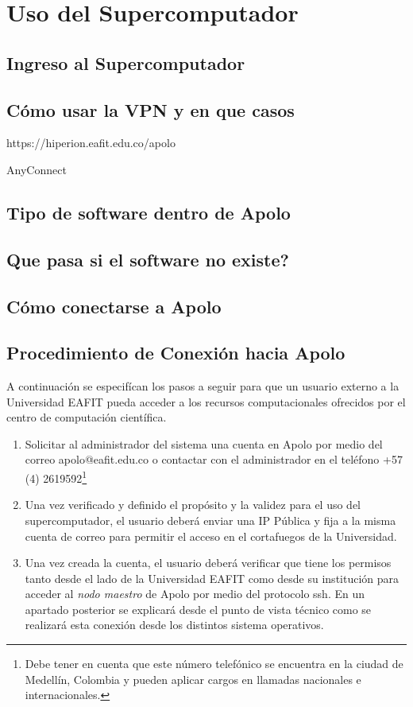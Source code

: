 \section{Uso del Supercomputador}

\subsection{Ingreso al Supercomputador}
\subsection{Cómo usar la VPN y en que casos}

https://hiperion.eafit.edu.co/apolo

AnyConnect

\subsection{Tipo de software dentro de Apolo}
\subsection{Que pasa si el software no existe?}
\subsection{Cómo conectarse a Apolo}


\subsection{Procedimiento de Conexión hacia Apolo}


A continuación se especifícan los pasos a seguir para que un usuario externo a la Universidad EAFIT pueda acceder a los recursos computacionales ofrecidos por el centro de computación científica. 

\begin{enumerate}
\item Solicitar al administrador del sistema una cuenta en Apolo por medio del correo apolo@eafit.edu.co o contactar con el administrador en el teléfono +57 (4) 2619592\footnote{Debe tener en cuenta que este número telefónico se encuentra en la ciudad de Medellín, Colombia y pueden aplicar cargos en llamadas nacionales e internacionales.} 
\item Una vez verificado y definido el propósito y la validez para el uso del supercomputador, el usuario deberá enviar una IP Pública y fija a la misma cuenta de correo para permitir el acceso en el cortafuegos de la Universidad.
\item Una vez creada la cuenta, el usuario deberá verificar que tiene los permisos tanto desde el lado de la Universidad EAFIT como desde su institución para acceder al \textit{nodo maestro} de Apolo por medio del protocolo ssh. En un apartado posterior se explicará desde el punto de vista técnico como se realizará esta conexión desde los distintos sistema operativos. 
\end{enumerate}


